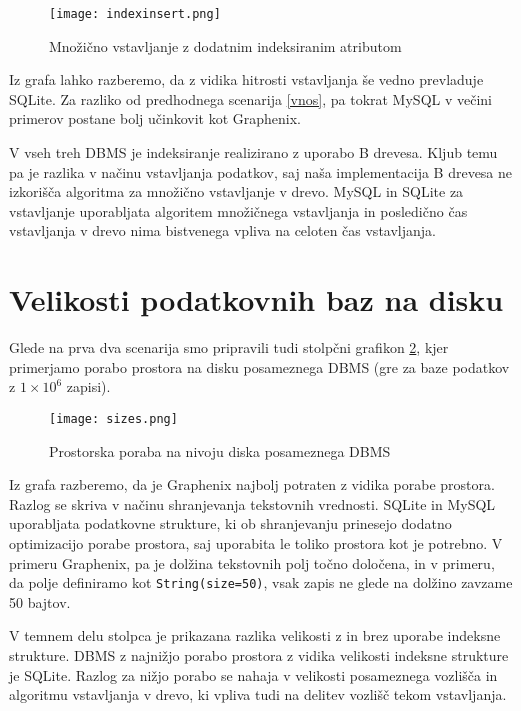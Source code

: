 \documentclass[a4paper,12pt,openright]{book}
\begin{document}
    \begin{figure}[H]
        \centerline{\texttt{[image: indexinsert.png]}}
        \caption{Množično vstavljanje z dodatnim indeksiranim atributom}
        \label{index_vnos}
    \end{figure}

    \noindent
    Iz grafa lahko razberemo, da z vidika hitrosti vstavljanja še vedno prevladuje SQLite. Za razliko od predhodnega scenarija \ref{vnos}, pa tokrat MySQL v večini primerov postane bolj učinkovit kot Graphenix.

    V vseh treh DBMS je indeksiranje realizirano z uporabo B drevesa. Kljub temu pa je razlika v načinu vstavljanja podatkov, saj naša implementacija B drevesa ne izkorišča algoritma za množično vstavljanje v drevo. MySQL in SQLite za vstavljanje uporabljata algoritem množičnega vstavljanja in posledično čas vstavljanja v drevo nima bistvenega vpliva na celoten čas vstavljanja.
 
    \section{Velikosti podatkovnih baz na disku}
    \label{size_analysis}

    Glede na prva dva scenarija smo pripravili tudi stolpčni grafikon \ref{velikosti}, kjer primerjamo porabo prostora na disku posameznega DBMS (gre za baze podatkov z $1 \times 10^6$ zapisi). 
    
    \begin{figure}[H]
        \centerline{\texttt{[image: sizes.png]}}
        \caption{Prostorska poraba na nivoju diska posameznega DBMS}
        \label{velikosti}
    \end{figure}

    \noindent
    Iz grafa razberemo, da je Graphenix najbolj potraten z vidika porabe prostora. Razlog se skriva v načinu shranjevanja tekstovnih vrednosti. SQLite in MySQL uporabljata podatkovne strukture, ki ob shranjevanju prinesejo dodatno optimizacijo porabe prostora, saj uporabita le toliko prostora kot je potrebno. V primeru Graphenix, pa je dolžina tekstovnih polj točno določena, in v primeru, da polje definiramo kot {\tt String(size=50)}, vsak zapis ne glede na dolžino zavzame 50 bajtov.

    V temnem delu stolpca je prikazana razlika velikosti z in brez uporabe indeksne strukture. DBMS z najnižjo porabo prostora z vidika velikosti indeksne strukture je SQLite. Razlog za nižjo porabo se nahaja v velikosti posameznega vozlišča in algoritmu vstavljanja v drevo, ki vpliva tudi na delitev vozlišč tekom vstavljanja.
\end{document}
